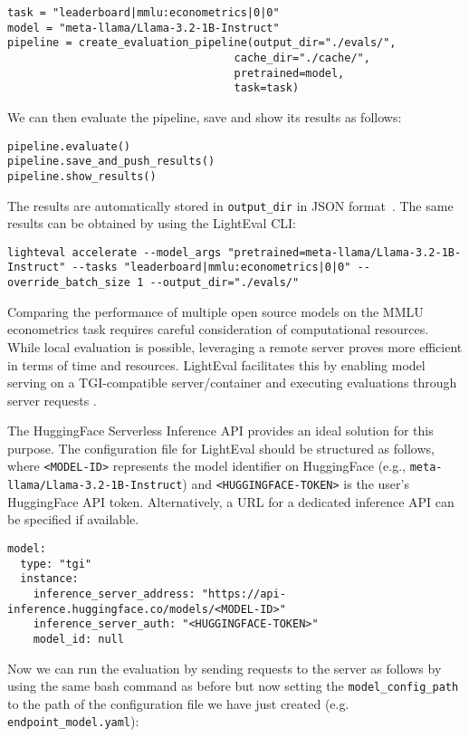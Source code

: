 \begin{verbatim}
task = "leaderboard|mmlu:econometrics|0|0"
model = "meta-llama/Llama-3.2-1B-Instruct"
pipeline = create_evaluation_pipeline(output_dir="./evals/", 
                                   cache_dir="./cache/", 
                                   pretrained=model, 
                                   task=task)
\end{verbatim}
We can then evaluate the pipeline, save and show its results as follows:

\begin{verbatim}
pipeline.evaluate()
pipeline.save_and_push_results()
pipeline.show_results()
\end{verbatim}

The results are automatically stored in \texttt{output\_dir} in JSON format~. The same results can be obtained by using the LightEval CLI:

\begin{verbatim}
lighteval accelerate --model_args "pretrained=meta-llama/Llama-3.2-1B-Instruct" --tasks "leaderboard|mmlu:econometrics|0|0" --override_batch_size 1 --output_dir="./evals/"
\end{verbatim}
Comparing the performance of multiple open source models on the MMLU econometrics task requires careful consideration of computational resources. While local evaluation is possible, leveraging a remote server proves more efficient in terms of time and resources. LightEval facilitates this by enabling model serving on a TGI-compatible server/container and executing evaluations through server requests .

The HuggingFace Serverless Inference API provides an ideal solution for this purpose. The configuration file for LightEval should be structured as follows, where \texttt{<MODEL-ID>} represents the model identifier on HuggingFace (e.g., \texttt{meta-llama/Llama-3.2-1B-Instruct}) and \texttt{<HUGGINGFACE-TOKEN>} is the user's HuggingFace API token. Alternatively, a URL for a dedicated inference API can be specified if available.

\begin{verbatim}
model:
  type: "tgi"
  instance:
    inference_server_address: "https://api-inference.huggingface.co/models/<MODEL-ID>"
    inference_server_auth: "<HUGGINGFACE-TOKEN>"
    model_id: null
\end{verbatim}
Now we can run the evaluation by sending requests to the server as follows by using the same bash command as before but now setting the \texttt{model\_config\_path} to the path of the configuration file we have just created (e.g. \texttt{endpoint\_model.yaml}):

